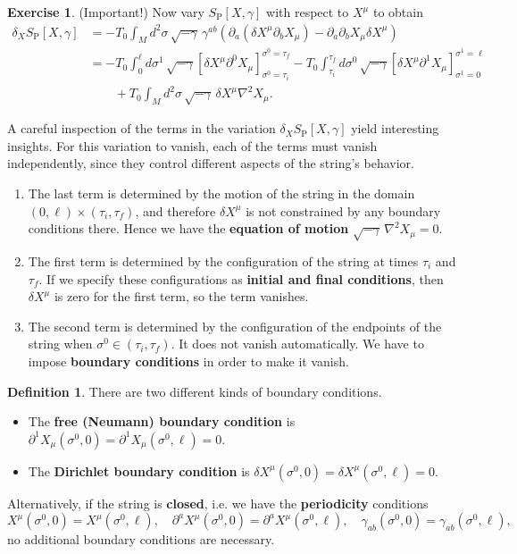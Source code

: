 \documentclass{report}
\theoremstyle{plain}
\theoremstyle{definition}
\newtheorem{definition}[theorem]{Definition}
\newtheorem{exercise}{Exercise}[section]
\theoremstyle{remark}
\newcommand{\di}{\partial}
\begin{document}
\begin{exercise} (Important!)
  Now vary $S_{\text{P}}[X, \gamma]$ with respect to $X^\mu$ to obtain
  \begin{align*}
    \delta_X S_{\text{P}}[X, \gamma]
    &= -T_0 \int_M d^2\sigma \, \sqrt{-\gamma} \, \gamma^{ab} \left(\di_a(\delta X^\mu \di_b X_\mu) - \di_a \di_b X_\mu \delta X^\mu\right) \\
    &= -T_0 \int_0^{\ell} d\sigma^1 \, \sqrt{-\gamma} \left[\delta X^\mu \di^0 X_\mu\right]_{\sigma^0=\tau_i}^{\sigma^0=\tau_f} - T_0 \int_{\tau_i}^{\tau_f} d\sigma^0 \, \sqrt{-\gamma} \left[\delta X^\mu \di^1 X_\mu\right]_{\sigma^1=0}^{\sigma^1=\ell} \\
    &\qquad + T_0 \int_M d^2\sigma \, \sqrt{-\gamma} \, \delta X^\mu \nabla^2 X_\mu.
  \end{align*}
\end{exercise}

A careful inspection of the terms in the variation $\delta_X
S_{\text{P}}[X, \gamma]$ yield interesting insights. For this
variation to vanish, each of the terms must vanish independently,
since they control different aspects of the string's behavior.
\begin{enumerate}
\item The last term is determined by the motion of the string in the
  domain $(0, \ell) \times (\tau_i, \tau_f)$, and therefore $\delta
  X^\mu$ is not constrained by any boundary conditions there. Hence we
  have the {\bf equation of motion} $\sqrt{-\gamma} \, \nabla^2 X_\mu
  = 0$.
\item The first term is determined by the configuration of the string
  at times $\tau_i$ and $\tau_f$. If we specify these configurations
  as {\bf initial and final conditions}, then $\delta X^\mu$ is zero
  for the first term, so the term vanishes.
\item The second term is determined by the configuration of the
  endpoints of the string when $\sigma^0 \in (\tau_i, \tau_f)$. It
  does not vanish automatically. We have to impose {\bf boundary
    conditions} in order to make it vanish.
\end{enumerate}

\begin{definition}
  There are two different kinds of boundary conditions.
  \begin{itemize}
  \item The {\bf free (Neumann) boundary condition} is $\di^1
    X_\mu(\sigma^0, 0) = \di^1 X_\mu(\sigma^0, \ell) = 0$.
  \item The {\bf Dirichlet boundary condition} is $\delta
    X^\mu(\sigma^0, 0) = \delta X^\mu(\sigma^0, \ell) = 0$.
  \end{itemize}
  Alternatively, if the string is {\bf closed}, i.e. we have the {\bf
    periodicity} conditions
  \[ X^\mu(\sigma^0, 0) = X^\mu(\sigma^0, \ell), \quad \di^a X^\mu(\sigma^0, 0) = \di^a X^\mu(\sigma^0, \ell), \quad \gamma_{ab}(\sigma^0, 0) = \gamma_{ab}(\sigma^0, \ell), \]
  no additional boundary conditions are necessary.
\end{definition}
\end{document}
